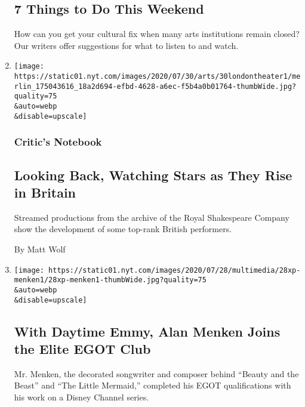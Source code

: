 \begin{enumerate}
  \hypertarget{7-things-to-do-this-weekend}{%
  \subsection{7 Things to Do This
  Weekend}\label{7-things-to-do-this-weekend}}

  How can you get your cultural fix when many arts institutions remain
  closed? Our writers offer suggestions for what to listen to and watch.
\item
  \href{/2020/07/30/theater/patsy-ferran-michelle-terry-lucian-msamati.html}{}

  \texttt{[image: https://static01.nyt.com/images/2020/07/30/arts/30londontheater1/merlin\_175043616\_18a2d694-efbd-4628-a6ec-f5b4a0b01764-thumbWide.jpg?quality=75\\\&auto=webp\\\&disable=upscale]}

  \hypertarget{critics-notebook-1}{%
  \subsubsection{Critic's Notebook}\label{critics-notebook-1}}

  \hypertarget{looking-back-watching-stars-as-they-rise-in-britain}{%
  \subsection{Looking Back, Watching Stars as They Rise in
  Britain}\label{looking-back-watching-stars-as-they-rise-in-britain}}

  Streamed productions from the archive of the Royal Shakespeare Company
  show the development of some top-rank British performers.

  By Matt Wolf
\item
  \href{/2020/07/28/arts/alan-menken-egot.html}{}

  \texttt{[image: https://static01.nyt.com/images/2020/07/28/multimedia/28xp-menken1/28xp-menken1-thumbWide.jpg?quality=75\\\&auto=webp\\\&disable=upscale]}

  \hypertarget{with-daytime-emmy-alan-menken-joins-the-elite-egot-club}{%
  \subsection{With Daytime Emmy, Alan Menken Joins the Elite EGOT
  Club}\label{with-daytime-emmy-alan-menken-joins-the-elite-egot-club}}

  Mr. Menken, the decorated songwriter and composer behind ``Beauty and
  the Beast'' and ``The Little Mermaid,'' completed his EGOT
  qualifications with his work on a Disney Channel series.


\end{enumerate}
